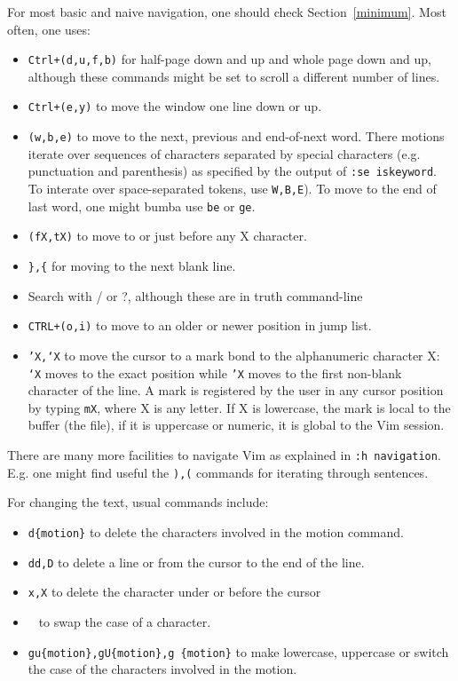 \documentclass{article}
\begin{document}
For most basic and naive navigation, one should check Section~\ref{minimum}.
Most often, one uses:
\begin{itemize}
  \item \texttt{Ctrl+(d,u,f,b)} for half-page down and up
and whole page down and up, although these commands might
be set to scroll a different number of lines.
  \item \texttt{Ctrl+(e,y)} to move the window one line down or up.
  \item \texttt{(w,b,e)} to move to the next, previous and end-of-next word. There motions iterate over sequences of characters separated
    by special characters (e.g. punctuation and parenthesis) as
    specified by the output of \texttt{:se iskeyword}.
    To interate over space-separated tokens, use \texttt{W,B,E}).
    To move to the end of last word, one might bumba use \texttt{be}
    or \texttt{ge}.
  \item \texttt{(fX,tX)} to move to or just before any X character.
  \item \texttt{\},\{} for moving to the next blank line.
  \item Search with / or ?, although these are in truth command-line 
  \item \texttt{CTRL+(o,i)} to move to an older or newer position in
    jump list.
  \item \texttt{'X,`X} to move the cursor to a mark bond to the alphanumeric character X: \texttt{`X} moves to the exact position while \texttt{'X} moves to
    the first non-blank character of the line.
    A mark is registered by the user in any cursor position
    by typing \texttt{mX}, where X is any letter.
    If X is lowercase, the mark is local to the buffer (the file),
    if it is uppercase or numeric, it is global to the Vim session.
\end{itemize}

There are many more facilities to navigate Vim
as explained in \texttt{:h navigation}.
E.g. one might find useful the \texttt{),(} commands
for iterating through sentences.

For changing the text, usual commands include:
\begin{itemize}
  \item \texttt{d\{motion\}} to delete the characters
    involved in the motion command.
  \item \texttt{dd,D} to delete a line or from the cursor to the end of the line.
  \item \texttt{x,X} to delete the character under or before the cursor  \item \texttt{~} to swap the case of a character.
  \item \texttt{gu\{motion\},gU\{motion\},g~\{motion\}} to make lowercase, uppercase or switch the case of the characters involved in the motion.
\end{itemize}
\end{document}
